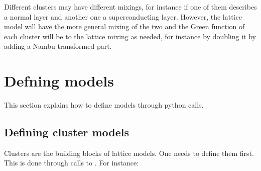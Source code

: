 \documentclass[letterpaper,10pt,english]{sphinxmanual}
\begin{document}
\sphinxAtStartPar
Different clusters may have different mixings, for instance if one of them describes a normal layer and another one a superconducting layer.
However, the lattice model will have the more general mixing of the two and the Green function of each cluster will be  to the lattice mixing as needed, for instance by doubling it by adding a Nambu transformed part.


\chapter{Defning models}
\label{\detokenize{defining_models:defning-models}}\label{\detokenize{defining_models::doc}}
\sphinxAtStartPar
This section explains how to define models through python calls.


\section{Defining cluster models}
\label{\detokenize{defining_models:defining-cluster-models}}
\sphinxAtStartPar
Clusters are the building blocks of lattice models. One needs to define them first.
This is done through calls to . For instance:

\begin{sphinxVerbatim}[commandchars=\\\{\}]
   
   \PYG{p}{[}\PYG{p}{[}   \PYG{p}{]} \PYG{p}{[}   \PYG{p}{]}\PYG{p}{]}
\end{sphinxVerbatim}
\end{document}
